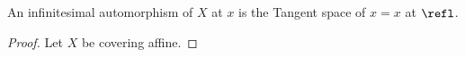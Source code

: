 \begin{definition}
	An infinitesimal automorphism of $X$ at $x$ is the Tangent space of $x = x$ at $\refl$.
\end{definition}

\begin{proof}
	Let $X$ be covering affine. %
	
	
\end{proof}

